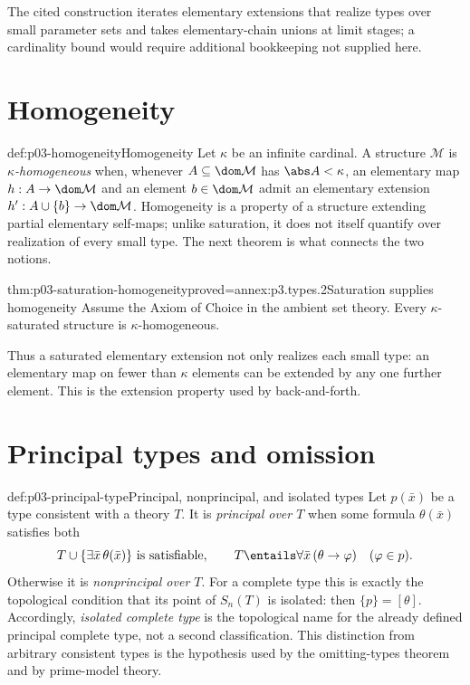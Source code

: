 The cited construction iterates elementary extensions that realize types over
small parameter sets and takes elementary-chain unions at limit stages; a
cardinality bound would require additional bookkeeping not supplied here.

\section{Homogeneity}
\label{sec:p03-homogeneity}

\begin{hbdefinition}{def:p03-homogeneity}{Homogeneity}
Let \(\kappa\) be an infinite cardinal.  A structure \(\mathcal M\) is
\emph{\(\kappa\)-homogeneous} when, whenever
\(A\subseteq\dom\mathcal M\) has \(\abs A<\kappa\), an elementary map
\(h:A\to\dom\mathcal M\) and an element \(b\in\dom\mathcal M\) admit an
elementary extension \(h':A\cup\{b\}\to\dom\mathcal M\).  Homogeneity is a
property of a structure extending partial elementary self-maps; unlike
saturation, it does not itself quantify over realization of every small type.
The next theorem is what connects the two notions.
\end{hbdefinition}

\begin{hbtheorem}{thm:p03-saturation-homogeneity}{proved=annex:p3.types.2}{Saturation supplies homogeneity}
Assume the Axiom of Choice in the ambient set theory.  Every
\(\kappa\)-saturated structure is \(\kappa\)-homogeneous.
\end{hbtheorem}

Thus a saturated elementary extension not only realizes each small type: an
elementary map on fewer than \(\kappa\) elements can be extended by any one
further element.  This is the extension property used by back-and-forth.

\section{Principal types and omission}
\label{sec:p03-omitting-types}

\begin{hbdefinition}{def:p03-principal-type}{Principal, nonprincipal, and isolated types}
Let \(p(\bar x)\) be a type consistent with a theory \(T\).  It is
\emph{principal over \(T\)} when some formula \(\theta(\bar x)\) satisfies
both
\[
 T\cup\{\exists\bar x\,\theta(\bar x)\}\text{ is satisfiable},
 \qquad
 T\entails\forall\bar x\,(\theta\to\varphi)
 \quad(\varphi\in p).
\]
Otherwise it is \emph{nonprincipal over \(T\)}.  For a complete type this
is exactly the topological condition that its point of \(S_n(T)\) is isolated:
then \(\{p\}=[\theta]\).  Accordingly, \emph{isolated complete type} is the
topological name for the already defined principal complete type, not a
second classification.  This distinction from arbitrary consistent types is
the hypothesis used by the omitting-types theorem and by prime-model theory.
\end{hbdefinition}

